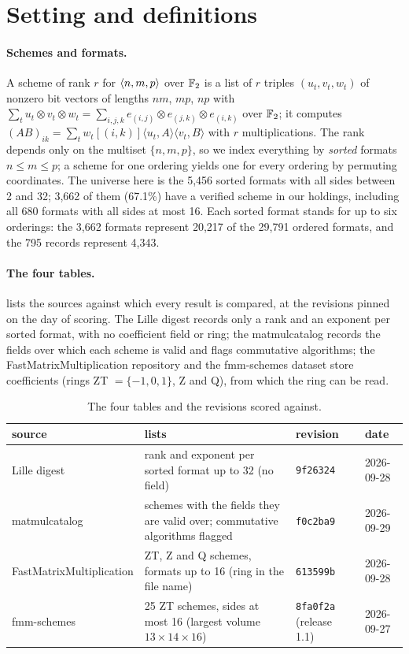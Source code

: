 \section{Setting and definitions}\label{sec:setting}

\paragraph{Schemes and formats.}
A scheme of rank $r$ for $\langle n,m,p\rangle$ over ${\mathbb{F}_2}$ is a list of $r$ triples $(u_t,v_t,w_t)$ of nonzero bit vectors of lengths $nm$, $mp$, $np$ with
$\sum_t u_t\otimes v_t\otimes w_t=\sum_{i,j,k}e_{(i,j)}\otimes e_{(j,k)}\otimes e_{(i,k)}$ over ${\mathbb{F}_2}$; it computes $(AB)_{ik}=\sum_t w_t[(i,k)]\langle u_t,A\rangle\langle v_t,B\rangle$ with $r$ multiplications.
The rank depends only on the multiset $\{n,m,p\}$, so we index everything by \emph{sorted} formats $n\le m\le p$; a scheme for one ordering yields one for every ordering by permuting coordinates.
The universe here is the 5{,}456 sorted formats with all sides between 2 and 32; 3{,}662 of them (67.1\%) have a verified scheme in our holdings, including all 680 formats with all sides at most 16.
Each sorted format stands for up to six orderings: the 3{,}662 formats represent 20{,}217 of the 29{,}791 ordered formats, and the 795 records represent 4{,}343.

\paragraph{The four tables.}
 lists the sources against which every result is compared, at the revisions pinned on the day of scoring.
The Lille digest records only a rank and an exponent per sorted format, with no coefficient field or ring; the matmulcatalog records the fields over which each scheme is valid and flags commutative algorithms;
the FastMatrixMultiplication repository and the fmm-schemes dataset store coefficients (rings ZT $=\{-1,0,1\}$, Z and Q), from which the ring can be read.
\begin{table}[t]
\centering\small
\begin{tabular}{@{}p{4.0cm}p{4.5cm}p{2.3cm}p{1.9cm}@{}}
\toprule
source & lists & revision & date\\
\midrule
Lille digest \cite{sedoglavic2026catalogue} & rank and exponent per sorted format up to 32 (no field) & \texttt{9f26324} & 2026-09-28\\
matmulcatalog \cite{lacelle2026catalog} & schemes with the fields they are valid over; commutative algorithms flagged & \texttt{f0c2ba9} & 2026-09-29\\
FastMatrixMultiplication \cite{perminov2026fmmrepo} & ZT, Z and Q schemes, formats up to 16 (ring in the file name) & \texttt{613599b} & 2026-09-28\\
fmm-schemes \cite{witteveen2026schemes} & 25 ZT schemes, sides at most 16 (largest volume $13\times14\times16$) & \texttt{8fa0f2a} (release 1.1) & 2026-09-27\\
\bottomrule
\end{tabular}
\caption{The four tables and the revisions scored against.}
\label{tab:sources}
\end{table}

